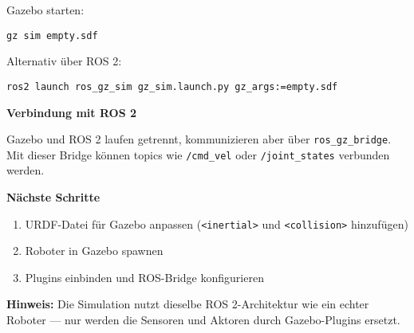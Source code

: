 \documentclass[a4paper,12pt]{article}
\begin{document}
Gazebo starten:
\begin{verbatim}
gz sim empty.sdf
\end{verbatim}
\vspace{0.5cm}

Alternativ über ROS 2:
\begin{verbatim}
ros2 launch ros_gz_sim gz_sim.launch.py gz_args:=empty.sdf
\end{verbatim}
\vspace{0.5cm}

\textbf{Verbindung mit ROS 2}

\vspace{0.5cm}

Gazebo und ROS 2 laufen getrennt, kommunizieren aber über \texttt{ros\_gz\_bridge}. Mit dieser Bridge können topics wie \texttt{/cmd\_vel} oder \texttt{/joint\_states} verbunden werden.

\textbf{Nächste Schritte}

\begin{enumerate}
  \item URDF-Datei für Gazebo anpassen (\texttt{<inertial>} und \texttt{<collision>} hinzufügen)
  \item Roboter in Gazebo spawnen
  \item Plugins einbinden und ROS-Bridge konfigurieren
\end{enumerate}

\textbf{Hinweis:} Die Simulation nutzt dieselbe ROS 2-Architektur wie ein echter Roboter — nur werden die Sensoren und Aktoren durch Gazebo-Plugins ersetzt.
\end{document}
